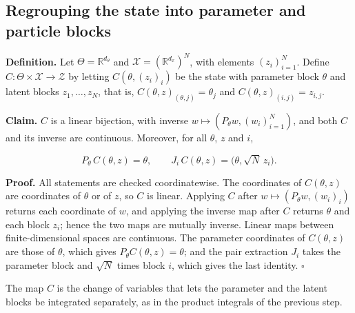 \documentclass[11pt,a4paper]{report}
\begin{document}
\subsection{\texorpdfstring{Regrouping the state into parameter and particle blocks}{Regrouping the state into parameter and particle blocks}}
\label{report-step-IPLA-MarginalConcentration-lean-6}


\textbf{Definition.} Let \(\Theta=\mathbb R^{d_\theta}\) and \(\mathcal X=(\mathbb R^{d_x})^N\), with elements \((z_i)_{i=1}^N\). Define \(C:\Theta\times\mathcal X\to\mathcal Z\) by letting \(C(\theta,(z_i)_i)\) be the state with parameter block \(\theta\) and latent blocks \(z_1,\dots,z_N\), that is, \(C(\theta,z)_{(\theta,j)}=\theta_j\) and \(C(\theta,z)_{(i,j)}=z_{i,j}\).




\textbf{Claim.} \(C\) is a linear bijection, with inverse \(w\mapsto(P_\theta w,(w_i)_{i=1}^N)\), and both \(C\) and its inverse are continuous. Moreover, for all \(\theta\), \(z\) and \(i\),


\[P_\theta\,C(\theta,z)=\theta,\qquad J_i\,C(\theta,z)=\bigl(\theta,\sqrt N\,z_i\bigr).\]


\textbf{Proof.} All statements are checked coordinatewise. The coordinates of \(C(\theta,z)\) are coordinates of \(\theta\) or of \(z\), so \(C\) is linear. Applying \(C\) after \(w\mapsto(P_\theta w,(w_i)_i)\) returns each coordinate of \(w\), and applying the inverse map after \(C\) returns \(\theta\) and each block \(z_i\); hence the two maps are mutually inverse. Linear maps between finite-dimensional spaces are continuous. The parameter coordinates of \(C(\theta,z)\) are those of \(\theta\), which gives \(P_\theta C(\theta,z)=\theta\); and the pair extraction \(J_i\) takes the parameter block and \(\sqrt N\) times block \(i\), which gives the last identity. \(\square\)




The map \(C\) is the change of variables that lets the parameter and the latent blocks be integrated separately, as in the product integrals of the previous step.
\end{document}
